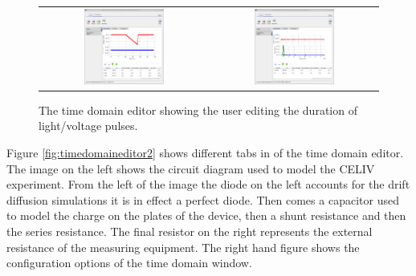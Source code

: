 \begin{figure}[H]
\centering
\begin{tabular}{ c c }

\includegraphics[width=0.5\textwidth,height=0.4\textwidth]{./images/time_domain_editor.png}

&
\includegraphics[width=0.5\textwidth,height=0.4\textwidth]{./images/time_domain_editor2.png}

\\

\end{tabular}
\caption{The time domain editor showing the user editing the duration of light/voltage pulses.}
\label{fig:timedomaineditor}
\end{figure}

Figure \ref{fig:timedomaineditor2} shows different tabs in of the time domain editor. The image on the left shows the circuit diagram used to model the CELIV experiment. From the left of the image the diode on the left accounts for the drift diffusion simulations it is in effect a perfect diode.  Then comes a capacitor used to model the charge on the plates of the device, then a shunt resistance and then the series resistance.  The final resistor on the right represents the external resistance of the measuring equipment.  The right hand figure shows the configuration options of the time domain window.

